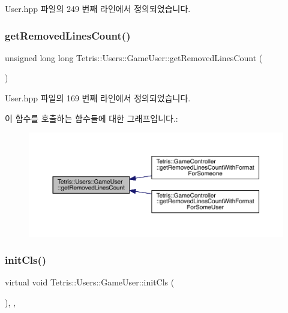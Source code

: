 User.\+hpp 파일의 249 번째 라인에서 정의되었습니다.

\mbox{\label{class_tetris_1_1_users_1_1_game_user_a5912def4d9d77adbb4323b35366724af}} 
\subsubsection{\texorpdfstring{get\+Removed\+Lines\+Count()}{getRemovedLinesCount()}}
{\footnotesize\ttfamily unsigned long long Tetris\+::\+Users\+::\+Game\+User\+::get\+Removed\+Lines\+Count (\begin{DoxyParamCaption}{ }\end{DoxyParamCaption})\hspace{0.3cm}{\ttfamily [inline]}}



User.\+hpp 파일의 169 번째 라인에서 정의되었습니다.

이 함수를 호출하는 함수들에 대한 그래프입니다.\+:
\nopagebreak
\begin{figure}[H]
\begin{center}
\leavevmode
\includegraphics[width=350pt]{class_tetris_1_1_users_1_1_game_user_a5912def4d9d77adbb4323b35366724af_icgraph}
\end{center}
\end{figure}
\mbox{\label{class_tetris_1_1_users_1_1_game_user_a8ec8ca43d0c6d0dc2c2e049ae1b4d316}} 
\subsubsection{\texorpdfstring{init\+Cls()}{initCls()}}
{\footnotesize\ttfamily virtual void Tetris\+::\+Users\+::\+Game\+User\+::init\+Cls (\begin{DoxyParamCaption}{ }\end{DoxyParamCaption})\hspace{0.3cm}{\ttfamily [inline]}, {\ttfamily [protected]}, {\ttfamily [virtual]}}



